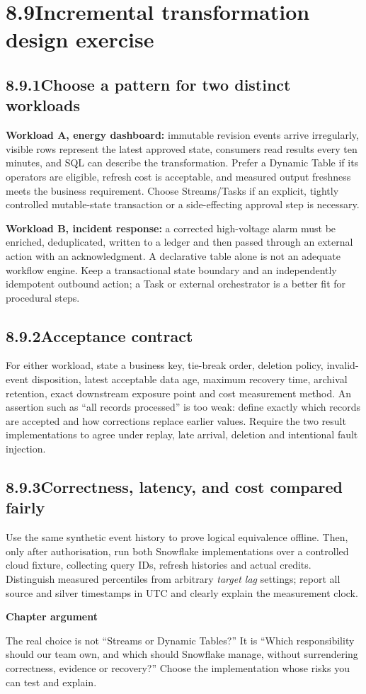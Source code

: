 \documentclass[11pt,twoside]{article}
\newcommand{\topic}[2]{\subsection*{#1\quad #2}}
\begin{document}
\section*{8.9\quad Incremental transformation design exercise}
\topic{8.9.1}{Choose a pattern for two distinct workloads}
\textbf{Workload A, energy dashboard:} immutable revision events arrive irregularly, visible rows represent the latest approved state, consumers read results every ten minutes, and SQL can describe the transformation. Prefer a Dynamic Table if its operators are eligible, refresh cost is acceptable, and measured output freshness meets the business requirement. Choose Streams/Tasks if an explicit, tightly controlled mutable-state transaction or a side-effecting approval step is necessary.\par
\textbf{Workload B, incident response:} a corrected high-voltage alarm must be enriched, deduplicated, written to a ledger and then passed through an external action with an acknowledgment. A declarative table alone is not an adequate workflow engine. Keep a transactional state boundary and an independently idempotent outbound action; a Task or external orchestrator is a better fit for procedural steps.
\topic{8.9.2}{Acceptance contract}
For either workload, state a business key, tie-break order, deletion policy, invalid-event disposition, latest acceptable data age, maximum recovery time, archival retention, exact downstream exposure point and cost measurement method. An assertion such as ``all records processed'' is too weak: define exactly which records are accepted and how corrections replace earlier values. Require the two result implementations to agree under replay, late arrival, deletion and intentional fault injection.
\topic{8.9.3}{Correctness, latency, and cost compared fairly}
Use the same synthetic event history to prove logical equivalence offline. Then, only after authorisation, run both Snowflake implementations over a controlled cloud fixture, collecting query IDs, refresh histories and actual credits. Distinguish measured percentiles from arbitrary \emph{target lag} settings; report all source and silver timestamps in UTC and clearly explain the measurement clock.
\begin{insight}\textbf{Chapter argument}\par
The real choice is not ``Streams or Dynamic Tables?'' It is ``Which responsibility should our team own, and which should Snowflake manage, without surrendering correctness, evidence or recovery?'' Choose the implementation whose risks you can test and explain.\end{insight}
\end{document}
